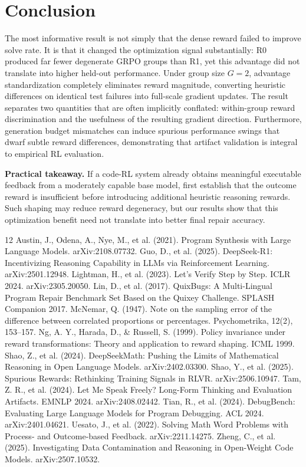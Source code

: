 \documentclass{article}
\begin{document}
\section{Conclusion}
The most informative result is not simply that the dense reward failed to improve solve rate. It is that it changed the optimization signal substantially: R0 produced far fewer degenerate GRPO groups than R1, yet this advantage did not translate into higher held-out performance. Under group size $G=2$, advantage standardization completely eliminates reward magnitude, converting heuristic differences on identical test failures into full-scale gradient updates. The result separates two quantities that are often implicitly conflated: within-group reward discrimination and the usefulness of the resulting gradient direction. Furthermore, generation budget mismatches can induce spurious performance swings that dwarf subtle reward differences, demonstrating that artifact validation is integral to empirical RL evaluation.

\textbf{Practical takeaway.} If a code-RL system already obtains meaningful executable feedback from a moderately capable base model, first establish that the outcome reward is insufficient before introducing additional heuristic reasoning rewards. Such shaping may reduce reward degeneracy, but our results show that this optimization benefit need not translate into better final repair accuracy.


\begin{thebibliography}{12}
 Austin, J., Odena, A., Nye, M., et al. (2021). Program Synthesis with Large Language Models. arXiv:2108.07732.
 Guo, D., et al. (2025). DeepSeek-R1: Incentivizing Reasoning Capability in LLMs via Reinforcement Learning. arXiv:2501.12948.
 Lightman, H., et al. (2023). Let's Verify Step by Step. ICLR 2024. arXiv:2305.20050.
 Lin, D., et al. (2017). QuixBugs: A Multi-Lingual Program Repair Benchmark Set Based on the Quixey Challenge. SPLASH Companion 2017.
 McNemar, Q. (1947). Note on the sampling error of the difference between correlated proportions or percentages. Psychometrika, 12(2), 153--157.
 Ng, A. Y., Harada, D., \& Russell, S. (1999). Policy invariance under reward transformations: Theory and application to reward shaping. ICML 1999.
 Shao, Z., et al. (2024). DeepSeekMath: Pushing the Limits of Mathematical Reasoning in Open Language Models. arXiv:2402.03300.
 Shao, Y., et al. (2025). Spurious Rewards: Rethinking Training Signals in RLVR. arXiv:2506.10947.
 Tam, Z. R., et al. (2024). Let Me Speak Freely? Long-Form Thinking and Evaluation Artifacts. EMNLP 2024. arXiv:2408.02442.
 Tian, R., et al. (2024). DebugBench: Evaluating Large Language Models for Program Debugging. ACL 2024. arXiv:2401.04621.
 Uesato, J., et al. (2022). Solving Math Word Problems with Process- and Outcome-based Feedback. arXiv:2211.14275.
 Zheng, C., et al. (2025). Investigating Data Contamination and Reasoning in Open-Weight Code Models. arXiv:2507.10532.
\end{thebibliography}
\end{document}

